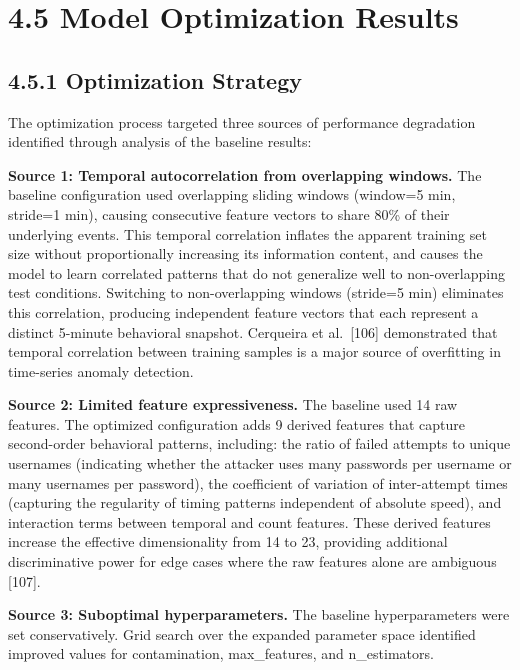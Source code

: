 \documentclass[
  a4paper]{report}
\begin{document}
\section{4.5 Model Optimization
Results}\label{model-optimization-results}

\subsection{4.5.1 Optimization Strategy}\label{optimization-strategy}

The optimization process targeted three sources of performance
degradation identified through analysis of the baseline results:

\textbf{Source 1: Temporal autocorrelation from overlapping windows.}
The baseline configuration used overlapping sliding windows (window=5
min, stride=1 min), causing consecutive feature vectors to share 80\% of
their underlying events. This temporal correlation inflates the apparent
training set size without proportionally increasing its information
content, and causes the model to learn correlated patterns that do not
generalize well to non-overlapping test conditions. Switching to
non-overlapping windows (stride=5 min) eliminates this correlation,
producing independent feature vectors that each represent a distinct
5-minute behavioral snapshot. Cerqueira et al.~{[}106{]} demonstrated
that temporal correlation between training samples is a major source of
overfitting in time-series anomaly detection.

\textbf{Source 2: Limited feature expressiveness.} The baseline used 14
raw features. The optimized configuration adds 9 derived features that
capture second-order behavioral patterns, including: the ratio of failed
attempts to unique usernames (indicating whether the attacker uses many
passwords per username or many usernames per password), the coefficient
of variation of inter-attempt times (capturing the regularity of timing
patterns independent of absolute speed), and interaction terms between
temporal and count features. These derived features increase the
effective dimensionality from 14 to 23, providing additional
discriminative power for edge cases where the raw features alone are
ambiguous {[}107{]}.

\textbf{Source 3: Suboptimal hyperparameters.} The baseline
hyperparameters were set conservatively. Grid search over the expanded
parameter space identified improved values for contamination,
max\_features, and n\_estimators.
\end{document}
